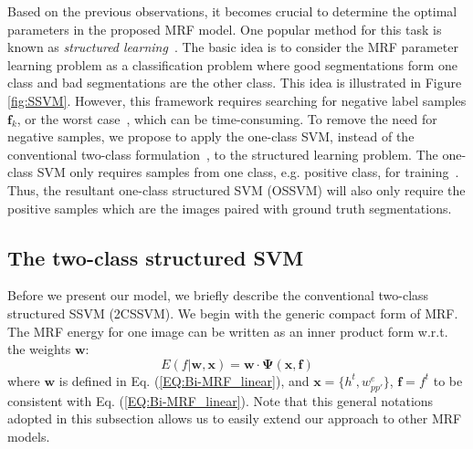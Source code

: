 \documentclass[10pt,journal,compsoc]{newIEEEtran}
\begin{document}
Based on the previous observations, it becomes crucial to determine the optimal parameters in the proposed MRF model. One popular method for this task is known as
\emph{structured learning}~\cite{Taskar05LargeMargin,Tsochantaridis05LargeMarginSSVM,Szummer08LearnCRFbyGC,Joachims2009CuttingPlaneSSVM}. The basic idea is to consider the MRF parameter learning problem as a classification problem where good segmentations form one class and bad segmentations are the other class. This idea is illustrated in Figure \ref{fig:SSVM}. However, this framework requires searching for negative label samples $\mathbf{f}_k$, or the worst case~\cite{Taskar05LargeMargin,Tsochantaridis05LargeMarginSSVM,Szummer08LearnCRFbyGC,Joachims2009CuttingPlaneSSVM}, which can be time-consuming. To remove the need for negative samples, we propose to apply the one-class SVM, instead of the conventional two-class formulation~\cite{Taskar05LargeMargin}, to the structured learning problem. The one-class SVM only requires samples from one class, e.g. positive class, for training~\cite{Scholkopf01oneclassSVM,chen2001one,manevitz2002one}. Thus, the resultant one-class structured SVM (OSSVM) will also only require the positive samples which are the images paired with ground truth segmentations.

\subsection{The two-class structured SVM}
Before we present our model, we briefly describe the conventional two-class structured SSVM (2CSSVM). We begin with the generic compact form of MRF. The MRF energy for one image can be written as an inner product form w.r.t. the weights $\mathbf{w}$:
\begin{equation}
E(f|\mathbf{w},\mathbf{x}) %
                = \mathbf{w}\cdot \mathbf{\Psi}(\mathbf{x},\mathbf{f})
\end{equation}
where $\mathbf{w}$ is defined in Eq. (\ref{EQ:Bi-MRF_linear}), and $\mathbf{x}=\{h^t,w_{pp'}^e\}$, $\mathbf{f}=f^t$ to be consistent with Eq. (\ref{EQ:Bi-MRF_linear}). Note that this general notations adopted in this subsection allows us to easily extend our approach to other MRF models.
\end{document}
